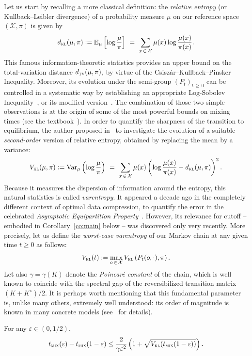 \documentclass[AHL,Unicode,longabstracts,published]{cedram}
\newcommand{\EE}{{\mathbb{E}}}
\newcommand{\cX}{\mathcal{X}}
\newcommand{\dtv}{d_{\textsc{tv}}}
\newcommand{\dkl}{d_{\textsc{kl}}}
\newcommand{\vkl}{V_{\textsc{kl}}}
\newcommand{\tmix}{t_{\textsc{mix}}}
\newcommand{\var}{{\mathrm{Var}}}
\begin{document}
Let us start by recalling a more classical definition: the \emph{relative entropy} (or Kullback--Leibler divergence) of a probability measure $\mu$ on our reference space $(\cX,\pi)$ is given by
\[
\dkl(\mu,\pi) := \EE_\mu\left[\log\frac{\mu}{\pi}\right] \ = \ \sum_{x\,\in\,\cX}\mu(x)\log\frac{\mu(x)}{\pi(x)}.
\]
This famous information-theoretic statistics provides an upper bound on the total-variation distance $\dtv(\mu,\pi)$, by virtue of the Csisz\'ar--Kullback--Pinsker Inequality. Moreover, its evolution under the semi-group $(P_t)_{t\,\ge\,0}$ can be controlled in a systematic way by establishing an appropriate Log-Sobolev Inequality~\cite{MR1410112}, or its modified version~\cite{MR2283379}. The combination of those two simple observations is at the origin of some of the most powerful bounds on mixing times (see the textbook~\cite{MR2341319}). In order to quantify the sharpness of the transition to equilibrium, the author proposed in~\cite{arxiv.2102.05597} to investigate the evolution of a suitable
\emph{second-order} version of relative entropy, obtained by replacing the mean by a variance:
\[
\vkl(\mu,\pi) := \var_\mu\left(\log\frac{\mu}{\pi}\right) \ = \ \sum_{x\,\in\,\cX}\mu(x)\left(\log\frac{\mu(x)}{\pi(x)}-\dkl(\mu,\pi)\right)^2.
\]
Because it measures the dispersion of information around the entropy, this natural statistics is called \emph{varentropy}. It appeared a decade ago in the completely different context of optimal data compression, to quantify the error in the celebrated \emph{Asymptotic Equipartition Property}~\cite{inproceedings}. However, its relevance for cutoff -- embodied in Corollary~\ref{co:main} below -- was discovered only very recently. More precisely, let us define the \emph{worst-case varentropy} of our Markov chain at any given time $t\ge 0$ as follows:
\[
\vkl(t) := \max_{o\,\in\,\cX}\vkl\left(P_t(o,\cdot),\pi\right).
\]
Let also $\gamma=\gamma(K)$ denote the \emph{Poincar\'e constant} of the chain, which is well known to coincide with the spectral gap of the reversibilized transition matrix $(K+K^\star)/2$. It is perhaps worth mentioning that this fundamental parameter is, unlike many others, extremely well understood: its order of magnitude is known in many concrete models (see~\cite{MR2341319} for details).


\begin{theo}\label{th:varentropy}
For any $\varepsilon \in(0,1/2)$,
\[
\tmix(\varepsilon)-\tmix(1-\varepsilon) \le \frac{2}{\gamma \varepsilon^2}\left(1+\sqrt{\vkl(\tmix(1-\varepsilon))}\right).
\]
\end{theo}
\end{document}

